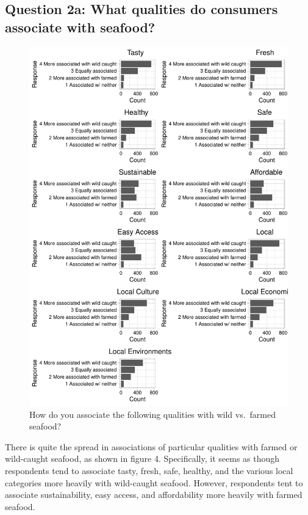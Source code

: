 \documentclass[
  12pt,
]{article}
\begin{document}
\hypertarget{question-2a-what-qualities-do-consumers-associate-with-seafood}{%
\subsection{Question 2a: What qualities do consumers associate with
seafood?}\label{question-2a-what-qualities-do-consumers-associate-with-seafood}}

\begin{figure}
\centering
\includegraphics{Final_rmd_files/figure-latex/qualities-1.pdf}
\caption{How do you associate the following qualities with wild
vs.~farmed seafood?}
\end{figure}

There is quite the spread in associations of particular qualities with
farmed or wild-caught seafood, as shown in figure 4. Specifically, it
seems as though respondents tend to associate tasty, fresh, safe,
healthy, and the various local categories more heavily with wild-caught
seafood. However, respondents tent to associate sustainability, easy
access, and affordability more heavily with farmed seafood.
\end{document}
